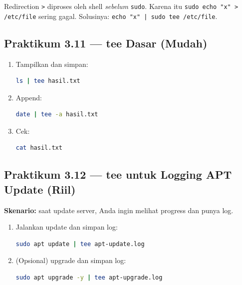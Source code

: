 \begin{notebox}
Redirection \texttt{>} diproses oleh shell \textit{sebelum} \texttt{sudo}.
Karena itu \texttt{sudo echo "x" > /etc/file} sering gagal.
Solusinya: \texttt{echo "x" | sudo tee /etc/file}.
\end{notebox}

\subsection*{Praktikum 3.11 --- tee Dasar (Mudah)}
\begin{enumerate}
    \item Tampilkan dan simpan:
\begin{lstlisting}[language=bash, caption={tee dasar}]
ls | tee hasil.txt
\end{lstlisting}

    \item Append:
\begin{lstlisting}[language=bash, caption={tee append}]
date | tee -a hasil.txt
\end{lstlisting}

    \item Cek:
\begin{lstlisting}[language=bash, caption={Cek hasil}]
cat hasil.txt
\end{lstlisting}
\end{enumerate}

\subsection*{Praktikum 3.12 --- tee untuk Logging APT Update (Riil)}
\textbf{Skenario:} saat update server, Anda ingin melihat progress dan punya log.

\begin{enumerate}
    \item Jalankan update dan simpan log:
\begin{lstlisting}[language=bash, caption={apt update dengan tee}]
sudo apt update | tee apt-update.log
\end{lstlisting}

    \item (Opsional) upgrade dan simpan log:
\begin{lstlisting}[language=bash, caption={apt upgrade dengan tee}]
sudo apt upgrade -y | tee apt-upgrade.log
\end{lstlisting}
\end{enumerate}

